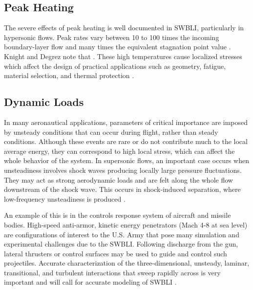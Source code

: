 \subsection{Peak Heating}
The severe effects of peak heating is well documented in SWBLI, particularly in hypersonic flows. Peak rates vary between 10 to 100 times the incoming boundary-layer flow and many times the equivalent stagnation point value \cite{Dolling2001}. Knight and Degrez note that  \cite{Knight1998}. These high temperatures cause localized stresses which affect the design of practical applications such as geometry, fatigue, material selection, and thermal protection \cite{Dolling2001}.

\subsection{Dynamic Loads}
In many aeronautical applications, parameters of critical importance are imposed by unsteady conditions that can occur during flight, rather than steady conditions. Although these events are rare or do not contribute much to the local average energy, they can correspond to high local stress, which can affect the whole behavior of the system. In supersonic flows, an important case occurs when unsteadiness involves shock waves producing locally large pressure fluctuations. They may act as strong aerodynamic loads and are felt along the whole flow downstream of the shock wave. This occurs in shock-induced separation, where low-frequency unsteadiness is produced \cite{Piponniau2009}.

An example of this is in the controls response system of aircraft and missile bodies. High-speed anti-armor, kinetic energy penetrators (Mach 4-8 at sea level) are configurations of interest to the U.S. Army that pose many simulation and experimental challenges due to the SWBLI. Following discharge from the gun, lateral thrusters or control surfaces may be used to guide and control such projectiles. Accurate characterization of the three-dimensional, unsteady, laminar, transitional, and turbulent interactions that sweep rapidly across is very important and will call for accurate modeling of SWBLI \cite{Dolling2001}. %

